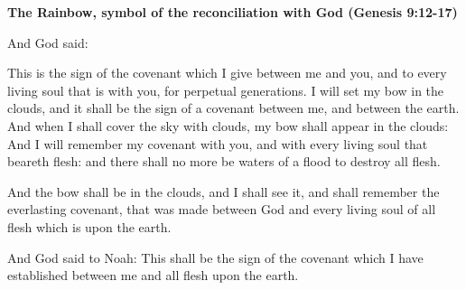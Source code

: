 \textbf{The Rainbow, symbol of the reconciliation with God (Genesis 9:12-17)}

And God said:

This is the sign of the covenant which I give between me and you, and to every living soul that is with you, for
perpetual generations. I will set my bow in the clouds, and it shall be the sign of a covenant between me, and between
the earth. And when I shall cover the sky with clouds, my bow shall appear in the clouds: And I will remember my
covenant with you, and with every living soul that beareth flesh: and there shall no more be waters of a flood to
destroy all flesh.

And the bow shall be in the clouds, and I shall see it, and shall remember the everlasting covenant, that was made
between God and every living soul of all flesh which is upon the earth.

And God said to Noah: This shall be the sign of the covenant which I have established between me and all flesh upon the
earth.

